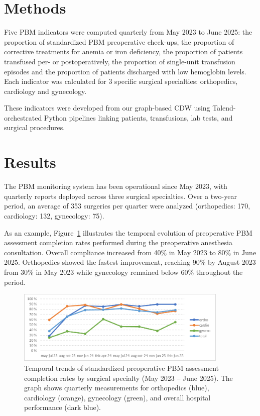 \documentclass{IOS-Book-Article}
\begin{document}
\section{Methods}

Five PBM indicators were computed quarterly from May 2023 to June 2025: the proportion of standardized PBM preoperative check-ups, the proportion of corrective treatments for anemia or iron deficiency, the proportion of patients transfused per- or postoperatively, the proportion of single-unit transfusion episodes and the proportion of patients discharged with low hemoglobin levels. Each indicator was calculated for 3 specific surgical specialties: orthopedics, cardiology and gynecology. 

These indicators were developed from our graph-based CDW \cite{Cance2022,Artemova2019}
using Talend-orchestrated Python pipelines linking patients, transfusions, lab tests, and surgical procedures.

\section{Results}

The PBM monitoring system has been operational since May 2023, with quarterly 
reports deployed across three surgical specialties. Over a two-year period, an 
average of 353 surgeries per quarter were analyzed (orthopedics: 170, 
cardiology: 132, gynecology: 75).

As an example, Figure~\ref{fig:pbm_trends} illustrates the temporal evolution of preoperative 
PBM assessment completion rates performed during the preoperative anesthesia consultation. Overall compliance increased from 40\% in May 2023 to 80\% in June 2025. Orthopedics showed the fastest improvement, reaching 90\% by August 2023 from 30\% in May 2023 while gynecology remained below 60\% throughout the period.

\begin{figure}[h!]
\centering
\includegraphics[width=0.9\textwidth]{figure.png}
\caption{Temporal trends of standardized preoperative PBM assessment completion rates by surgical specialty (May 2023 -- June 2025). The graph shows quarterly measurements for orthopedics (blue), cardiology (orange), gynecology (green), and overall hospital performance (dark blue).}
\label{fig:pbm_trends}
\vspace{-1em}
\end{figure}
\end{document}
